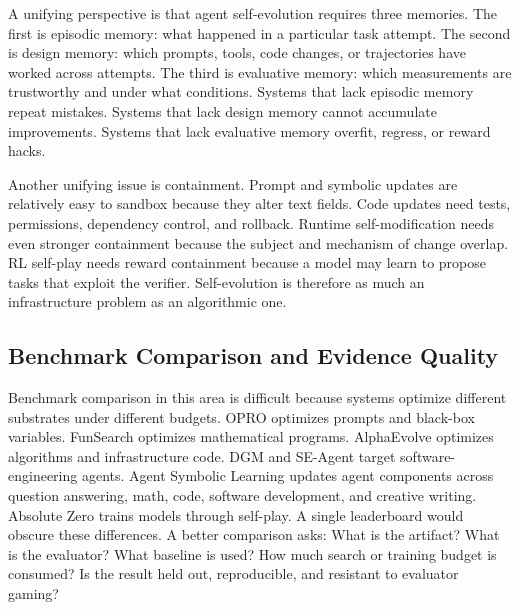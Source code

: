 A unifying perspective is that agent self-evolution requires three memories.  The first is episodic memory: what happened in a particular task attempt.  The second is design memory: which prompts, tools, code changes, or trajectories have worked across attempts.  The third is evaluative memory: which measurements are trustworthy and under what conditions.  Systems that lack episodic memory repeat mistakes.  Systems that lack design memory cannot accumulate improvements.  Systems that lack evaluative memory overfit, regress, or reward hacks.

Another unifying issue is containment.  Prompt and symbolic updates are relatively easy to sandbox because they alter text fields.  Code updates need tests, permissions, dependency control, and rollback.  Runtime self-modification needs even stronger containment because the subject and mechanism of change overlap.  RL self-play needs reward containment because a model may learn to propose tasks that exploit the verifier.  Self-evolution is therefore as much an infrastructure problem as an algorithmic one.

\subsection{Benchmark Comparison and Evidence Quality}
\label{subsec:benchmark-comparison}

Benchmark comparison in this area is difficult because systems optimize different substrates under different budgets.  OPRO optimizes prompts and black-box variables.  FunSearch optimizes mathematical programs.  AlphaEvolve optimizes algorithms and infrastructure code.  DGM and SE-Agent target software-engineering agents.  Agent Symbolic Learning updates agent components across question answering, math, code, software development, and creative writing.  Absolute Zero trains models through self-play.  A single leaderboard would obscure these differences.  A better comparison asks: What is the artifact?  What is the evaluator?  What baseline is used?  How much search or training budget is consumed?  Is the result held out, reproducible, and resistant to evaluator gaming?


